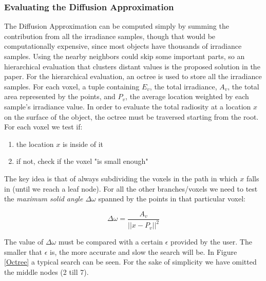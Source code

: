 \documentclass{article}
\begin{document}
\subsubsection{Evaluating the Diffusion Approximation}
\label{sec:diffaprox}
The Diffusion Approximation can be computed simply by summing the contribution from all the irradiance samples, though that would be computationally expensive, since most objects have thousands of irradiance samples. Using the nearby neighbors could skip some important parts, so an hierarchical evaluation that clusters distant values is the proposed solution in the paper.
For the hierarchical evaluation, an octree is used to store all the irradiance samples. For each voxel, a tuple containing $E_v$, the total irradiance, $A_v$, the total area represented by the points, and $P_v$, the average location weighted by each sample's irradiance value.
In order to evaluate the total radiosity at a location $x$ on the surface of the object, the octree must be traversed starting from the root. For each voxel we test if:

\begin{enumerate}
	\item the location $x$ is inside of it
	\item if not, check if the voxel "is small enough" 
\end{enumerate}

The key idea is that of always subdividing the voxels in the path in which $x$ falls in (until we reach a leaf node). For all the other branches/voxels we need to test the \textit{maximum solid angle $\Delta\omega$} spanned by the points in that particular voxel:

\begin{equation}
\Delta\omega = \frac{A_v}{||x - P_v||^2}
\end{equation}

The value of $\Delta\omega$ must be compared with a certain $\epsilon$ provided by the user. The smaller that $\epsilon$ is, the more accurate and slow the search will be. In Figure \ref{Octree} a typical search can be seen. For the sake of simplicity we have omitted the middle nodes (2 till 7).
\end{document}

